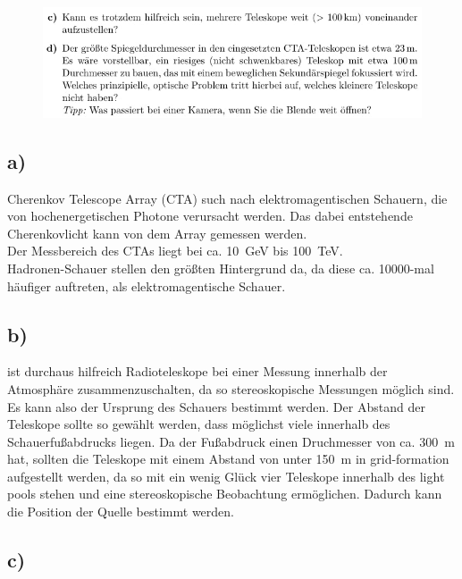     \begin{figure}[H]
        \centering
        \includegraphics[width=\textwidth]{images/Aufgabe23b.jpg}
        \label{fig:4}
    \end{figure}

\subsection{a)}

    \justifying Cherenkov Telescope Array (CTA) such nach elektromagentischen Schauern, die von hochenergetischen
    Photone verursacht werden. Das dabei entstehende Cherenkovlicht kann von dem Array gemessen werden.\\
    Der Messbereich des CTAs liegt bei ca. \SI{10}{\giga\electronvolt} bis \SI{100}{\tera\electronvolt}.\\
    Hadronen-Schauer stellen den größten Hintergrund da, da diese ca. 10000-mal häufiger auftreten, als 
    elektromagentische Schauer.

\subsection{b)}

    \justifying ist durchaus hilfreich Radioteleskope bei einer Messung innerhalb der Atmosphäre 
    zusammenzuschalten, da so stereoskopische Messungen möglich sind. Es kann also der Ursprung des Schauers bestimmt
    werden. Der Abstand der Teleskope sollte so gewählt werden, dass möglichst viele innerhalb des Schauerfußabdrucks 
    liegen. Da der Fußabdruck einen Druchmesser von ca. \SI{300}{\meter} hat, sollten die Teleskope mit einem Abstand von unter
    \SI{150}{\meter} in grid-formation aufgestellt werden, da so mit ein wenig Glück vier Teleskope innerhalb des light pools
    stehen und eine stereoskopische Beobachtung ermöglichen. Dadurch kann die Position der Quelle bestimmt werden. 

\subsection{c)}

